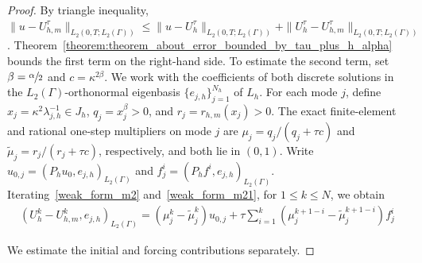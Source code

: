 \documentclass[numbers,webpdf]{ima-authoring-template}%
\theoremstyle{thmstyletwo}%
\numberwithin{equation}{section}
\begin{document}
\begin{proof}
    By triangle inequality, $\|u-U_{h,m}^\tau\|_{L_2(0,T;L_2(\Gamma))} \leq \|u-U_h^\tau\|_{L_2(0,T;L_2(\Gamma))} + \|U_h^\tau - U_{h,m}^\tau\|_{L_2(0,T;L_2(\Gamma))}$. Theorem~\ref{theorem:theorem_about_error_bounded_by_tau_plus_h_alpha} bounds the first term on the right-hand side. To estimate the second term, set $\beta=\sfrac{\alpha}{2}$ and $c=\kappa^{2\beta}$. We work with the coefficients of both discrete solutions in the $L_2(\Gamma)$-orthonormal eigenbasis $\{e_{j,h}\}_{j=1}^{N_h}$ of $L_h$. For each mode $j$, define $x_j=\kappa^2\lambda_{j,h}^{-1}\in J_h$, $q_j=x_j^\beta>0$, and $r_j=r_{h,m}(x_j)>0$. The exact finite-element and rational one-step multipliers on mode $j$ are $ \mu_j=q_j/(q_j+\tau c)$ and $\widetilde \mu_j=r_j/(r_j+\tau c)$, respectively, and both lie in $(0,1)$.  Write $u_{0,j}=(P_hu_0,e_{j,h})_{L_2(\Gamma)}$ and $f_j^i=(P_hf^i,e_{j,h})_{L_2(\Gamma)}$. Iterating~\eqref{weak_form_m2} and~\eqref{weak_form_m21}, for $1\leq k\leq N$, we obtain
    \begin{align}
    \label{eq:inner_product_difference}
    \textstyle
         (U_h^k-U_{h,m}^k,e_{j,h})_{L_2(\Gamma)} =( \mu_j^k-\widetilde \mu_j^k)u_{0,j} +\tau\sum_{i=1}^k ( \mu_j^{k+1-i}-\widetilde \mu_j^{k+1-i})f_j^i
    \end{align}

    We estimate the initial and forcing contributions separately.


\end{proof}
\end{document}
